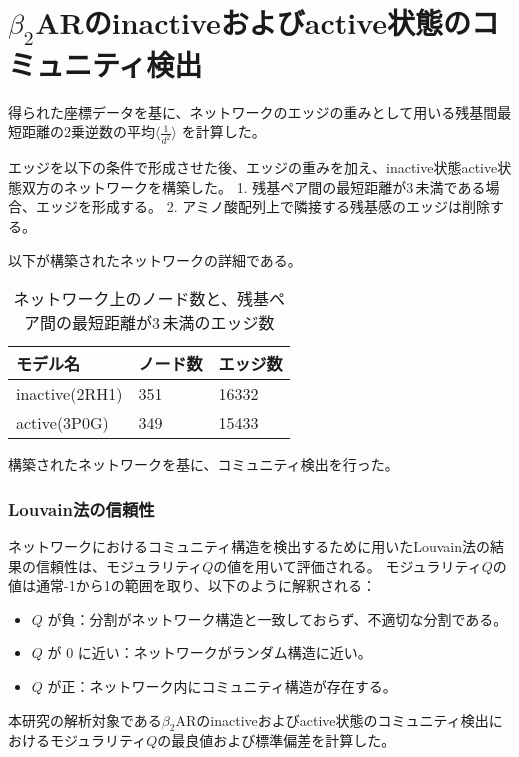 \newpage


\section{$\beta_2$ARのinactiveおよびactive状態のコミュニティ検出}

得られた座標データを基に、ネットワークのエッジの重みとして用いる残基間最短距離の2乗逆数の平均$\langle \frac{1}{d^2} \rangle$ を計算した。

エッジを以下の条件で形成させた後、エッジの重みを加え、inactive状態active状態双方のネットワークを構築した。
1. 残基ペア間の最短距離が3\,\text{\AA}未満である場合、エッジを形成する。
2. アミノ酸配列上で隣接する残基感のエッジは削除する。

以下が構築されたネットワークの詳細である。
\begin{table}[!ht]
    \centering
    \caption{ネットワーク上のノード数と、残基ペア間の最短距離が3\,\text{\AA}未満のエッジ数}
    \begin{tabular}{lll}
      \hline
      モデル名          & ノード数  & エッジ数 \\
      \hline 
      inactive(2RH1)  &  351 &  16332 \\ 
      active(3P0G)    &  349 &  15433 \\ 
    \end{tabular}
    \label{tab:network_size}
  \end{table}

構築されたネットワークを基に、コミュニティ検出を行った。
\subsubsection{Louvain法の信頼性}

ネットワークにおけるコミュニティ構造を検出するために用いたLouvain法の結果の信頼性は、モジュラリティ$Q$の値を用いて評価される。
モジュラリティ$Q$の値は通常-1から1の範囲を取り、以下のように解釈される：

\begin{itemize}
    \item \( Q \) が負：分割がネットワーク構造と一致しておらず、不適切な分割である。
    \item \( Q \) が 0 に近い：ネットワークがランダム構造に近い。
    \item \( Q \) が正：ネットワーク内にコミュニティ構造が存在する。
\end{itemize}

本研究の解析対象である$\beta_2$ARのinactiveおよびactive状態のコミュニティ検出におけるモジュラリティ$Q$の最良値および標準偏差を計算した。

